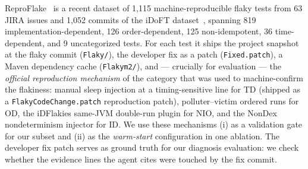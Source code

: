 ReproFlake~\cite{zhang2026reproflake} is a recent dataset of 1{,}115
machine-reproducible flaky tests from 63 JIRA issues and 1{,}052 commits of
the iDoFT dataset~\cite{parry2022survey}, spanning 819 implementation-dependent,
126 order-dependent, 125 non-idempotent, 36 time-dependent, and 9 uncategorized
tests. For each test it ships the project snapshot at the flaky commit
(\texttt{Flaky/}), the developer fix as a patch (\texttt{Fixed.patch}), a
Maven dependency cache (\texttt{Flakym2/}), and — crucially for evaluation —
the \emph{official reproduction mechanism} of the category that was used to
machine-confirm the flakiness: manual sleep injection at a timing-sensitive
line for TD (shipped as a \texttt{FlakyCodeChange.patch} reproduction patch),
polluter--victim ordered runs for OD, the iDFlakies same-JVM double-run plugin
for NIO, and the NonDex nondeterminism injector for ID. We use these mechanisms (i) as a
validation gate for our subset and (ii) as the \emph{warm-start} configuration
in one ablation. The developer fix patch serves as ground truth for our
diagnosis evaluation: we check whether the evidence lines the agent cites
were touched by the fix commit.
